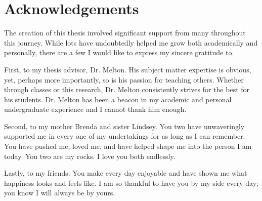 
\cleardoublepage
\thispagestyle{empty}

\chapter{Acknowledgements}
\noindent The creation of this thesis involved significant support from many
throughout this journey. While lots have undoubtedly helped me grow
both academically and personally, there are a few I would like to express my 
sincere gratitude to. \newline

\noindent First, to my thesis advisor, Dr. Melton. His subject matter expertise is obvious, yet, 
perhaps more importantly, so is his passion for teaching others. Whether through classes or this research,
Dr. Melton consistently strives for the best for his students. Dr. Melton has been a beacon in my academic 
and personal undergraduate experience and I cannot thank him enough. \newline

\noindent Second, to my mother Brenda and sister Lindsey. You two have unwaveringly supported me 
in every one of my undertakings for as long as I can remember. 
You have pushed me, loved me, and have helped shape me into the person I am today.
You two are my rocks. I love you both endlessly.\newline

\noindent Lastly, to my friends. You make every day enjoyable and have shown me what happiness looks and
feels like. I am so thankful to have you by my side every day; you know I will always be by yours.
\cleardoublepage

